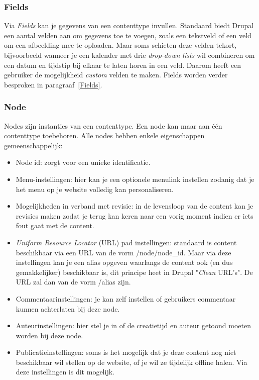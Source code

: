 \subsubsection{Fields}
Via \textit{Fields} kan je gegevens van een contenttype invullen. Standaard biedt Drupal een aantal velden aan om gegevens toe te voegen, zoals een tekstveld of een veld om een afbeelding mee te oploaden. Maar soms schieten deze velden tekort, bijvoorbeeld wanneer je een kalender met drie \textit{drop-down lists} wil combineren om een datum en tijdstip bij elkaar te laten horen in een veld. Daarom heeft een gebruiker de mogelijkheid \textit{custom} velden te maken. Fields worden verder besproken in paragraaf~\ref{Fields}.

\subsubsection{Node}
Nodes zijn instanties van een contenttype. Een node kan maar aan \'{e}\'{e}n contenttype toebehoren.
Alle nodes hebben enkele eigenschappen gemeenschappelijk:
\begin{itemize}
\item Node id: zorgt voor een unieke identificatie.
\item Menu-instellingen: hier kan je een optionele menulink instellen zodanig dat je het menu op je website volledig kan personaliseren.
\item Mogelijkheden in verband met revisie: in de levensloop van de content kan je revisies maken zodat je terug kan keren naar een vorig moment indien er iets fout gaat met de content.
\item \textit{Uniform Resource Locator} (URL)  pad instellingen: standaard is content beschikbaar via een URL van de vorm /node/node\_id. Maar via deze instellingen kan je een alias opgeven waarlangs de content ook (en dus gemakkelijker) beschikbaar is, dit principe heet in Drupal "\textit{Clean} URL's". De URL zal dan van de vorm /alias zijn.
\item Commentaarinstellingen: je kan zelf instellen of gebruikers commentaar kunnen achterlaten bij deze node.
\item Auteurinstellingen: hier stel je in of de creatietijd en auteur getoond moeten worden bij deze node.
\item Publicatieinstellingen: soms is het mogelijk dat je deze content nog niet beschikbaar wil stellen op de website, of je wil ze tijdelijk offline halen. Via deze instellingen is dit mogelijk.
\end{itemize}

